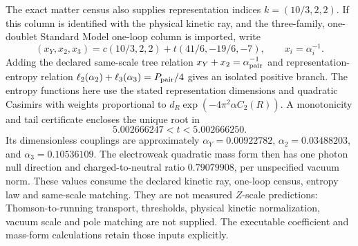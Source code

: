 The exact matter census also supplies representation indices
\(k=(10/3,2,2)\). If this column is identified with the physical kinetic ray,
and the three-family, one-doublet Standard Model one-loop column is
imported, write
\[
 (x_Y,x_2,x_3)=c(10/3,2,2)+t(41/6,-19/6,-7),\qquad
 x_i=\alpha_i^{-1}.
\]
Adding the declared same-scale tree relation
\(x_Y+x_2=\alpha_{\rm pair}^{-1}\) and representation-entropy relation
\(\ell_2(\alpha_2)+\ell_3(\alpha_3)=P_{\rm pair}/4\) gives an isolated
positive branch. The entropy functions here use the stated representation
dimensions and quadratic Casimirs with weights proportional to
\(d_R\exp(-4\pi^2\alpha C_2(R))\). A monotonicity and tail certificate
encloses the unique root in
\[
 5.002666247<t<5.002666250.
\]
Its dimensionless couplings are approximately
\(\alpha_Y=0.00922782\), \(\alpha_2=0.03488203\), and
\(\alpha_3=0.10536109\). The electroweak quadratic mass form then has one
photon null direction and charged-to-neutral ratio \(0.79079908\), per
unspecified vacuum norm. These values consume the declared kinetic ray,
one-loop census, entropy law and same-scale matching. They are not measured
\(Z\)-scale predictions: Thomson-to-running transport, thresholds, physical
kinetic normalization, vacuum scale and pole matching are not supplied.
The executable coefficient and mass-form calculations retain those inputs
explicitly.

